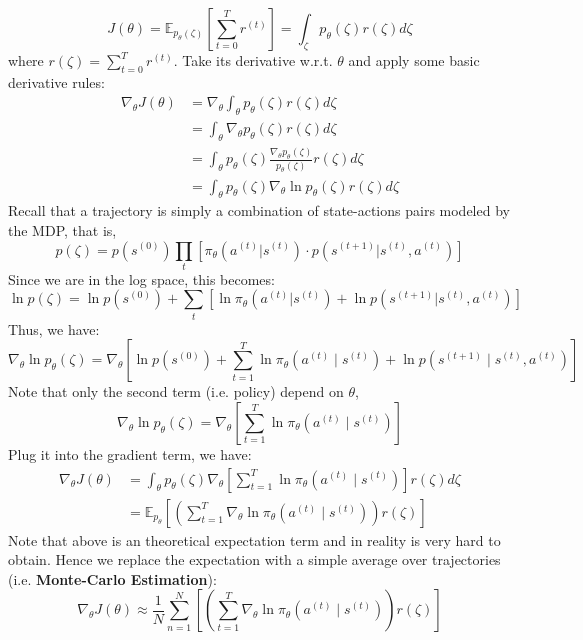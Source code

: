 \documentclass[11pt]{article}
\begin{document}
$$J(\theta)=\mathbb{E}_{p_{\theta}(\zeta)}\left[\sum_{t=0}^{T} r^{(t)}\right]=\int_{\zeta} p_{\theta}(\zeta) r(\zeta) d \zeta$$ where $r(\zeta)=\sum_{t=0}^{T} r^{(t)}$. Take its derivative w.r.t. $\theta$ and apply some basic derivative rules:
\begin{align*}
\nabla_{\theta} J(\theta) &=\nabla_{\theta} \int_{\theta} p_{\theta}(\zeta) r(\zeta) d \zeta  \\
&=\int_{\theta} \nabla_{\theta} p_{\theta}(\zeta) r(\zeta) d \zeta \\
&=\int_{\theta} p_{\theta}(\zeta) \frac{\nabla_{\theta} p_{\theta}(\zeta)}{p_{\theta}(\zeta)} r(\zeta) d \zeta \\
&=\int_{\theta} p_{\theta}(\zeta) \nabla_{\theta} \ln p_{\theta}(\zeta) r(\zeta) d \zeta
\end{align*}
Recall that a trajectory is simply a combination of state-actions pairs modeled by the MDP, that is, 
$$p(\zeta) = p(s^{(0)}) \prod_t \left[\pi_\theta(a^{(t)} | s^{(t)}) \cdot p(s^{(t+1)} | s^{(t)}, a^{(t)})\right]$$
Since we are in the log space, this becomes:
$$\ln p(\zeta) = \ln p(s^{(0)}) + \sum_t \left[\ln \pi_\theta(a^{(t)} | s^{(t)}) + \ln p(s^{(t+1)} | s^{(t)}, a^{(t)})\right]$$
Thus, we have:
$$\nabla_{\theta} \ln p_{\theta}(\zeta) =\nabla_{\theta}\left[\ln p\left(s^{(0)}\right)+\sum_{t=1}^{T} \ln \pi_{\theta}\left(a^{(t)} \mid s^{(t)}\right)+\ln p\left(s^{(t+1)} \mid s^{(t)}, a^{(t)}\right)\right] $$ 
Note that only the second term (i.e. policy) depend on $\theta$,
$$\nabla_{\theta} \ln p_{\theta}(\zeta) =\nabla_{\theta}\left[\sum_{t=1}^{T} \ln \pi_{\theta}\left(a^{(t)} \mid s^{(t)}\right)\right]$$
Plug it into the gradient term, we have:
\begin{align*}
\nabla_{\theta} J(\theta) &=\int_{\theta} p_{\theta}(\zeta) \nabla_{\theta}\left[\sum_{t=1}^{T} \ln \pi_{\theta}\left(a^{(t)} \mid s^{(t)}\right)\right] r(\zeta) d \zeta \\
 &=\mathbb{E}_{p_{\theta}}\left[\left(\sum_{t=1}^{T} \nabla_{\theta} \ln \pi_{\theta}\left(a^{(t)} \mid s^{(t)}\right)\right) r(\zeta)\right]
\end{align*} 
Note that above is an theoretical expectation term and in reality is very hard to obtain. Hence we replace the expectation with a simple average over trajectories (i.e. \textbf{Monte-Carlo Estimation}):
$$\nabla_{\theta} J(\theta) \approx \frac{1}{N} \sum_{n=1}^{N} \left[\left(\sum_{t=1}^{T} \nabla_{\theta} \ln \pi_{\theta}\left(a^{(t)} \mid s^{(t)}\right)\right) r(\zeta)\right]$$
\end{document}
